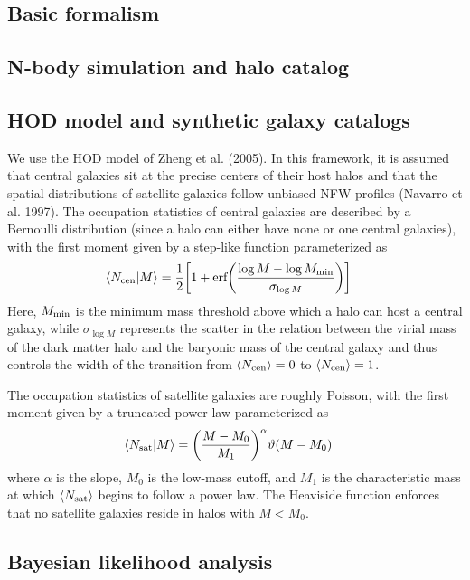 \subsection{Basic formalism}

\subsection{N-body simulation and halo catalog}

\subsection{HOD model and synthetic galaxy catalogs}

We use the HOD model of Zheng et al. (2005). In this framework, it is assumed that central galaxies sit at the precise centers of their host halos and that the spatial distributions of satellite galaxies follow unbiased NFW profiles (Navarro et al. 1997). The occupation statistics of central galaxies are described by a Bernoulli distribution (since a halo can either have none or one central galaxies), with the first moment given by a step-like function parameterized as
\begin{align}
    \langle N_{\rm cen} | M \rangle &= \frac{1}{2}{\bigg [}1 + \text{erf}{\bigg(}\frac{\log M - \log M_{\rm min}}{\sigma_{\log M}}{\bigg)}{\bigg ]} \label{eqn:hod_cen}
\end{align}
Here, $M_{\rm min}$ is the minimum mass threshold above which a halo can host a central galaxy, while $\sigma_{\log M}$ represents the scatter in the relation between the virial mass of the dark matter halo and the baryonic mass of the central galaxy and thus controls the width of the transition from $\langle N_{\rm cen} \rangle = 0$ to $\langle N_{\rm cen} \rangle = 1$. 

The occupation statistics of satellite galaxies are roughly Poisson, with the first moment given by a truncated power law parameterized as 
\begin{align}
    \langle N_{\rm sat} | M \rangle &= {\bigg (}\frac{M - M_0}{M_1}{\bigg )}^{\alpha}\vartheta(M - M_0) \label{eqn:hod_sat}
\end{align}
where $\alpha$ is the slope, $M_0$ is the low-mass cutoff, and $M_1$ is the characteristic mass at which $\langle N_{\rm sat} \rangle$ begins to follow a power law. The Heaviside function enforces that no satellite galaxies reside in halos with $M < M_0$.

\subsection{Bayesian likelihood analysis}

